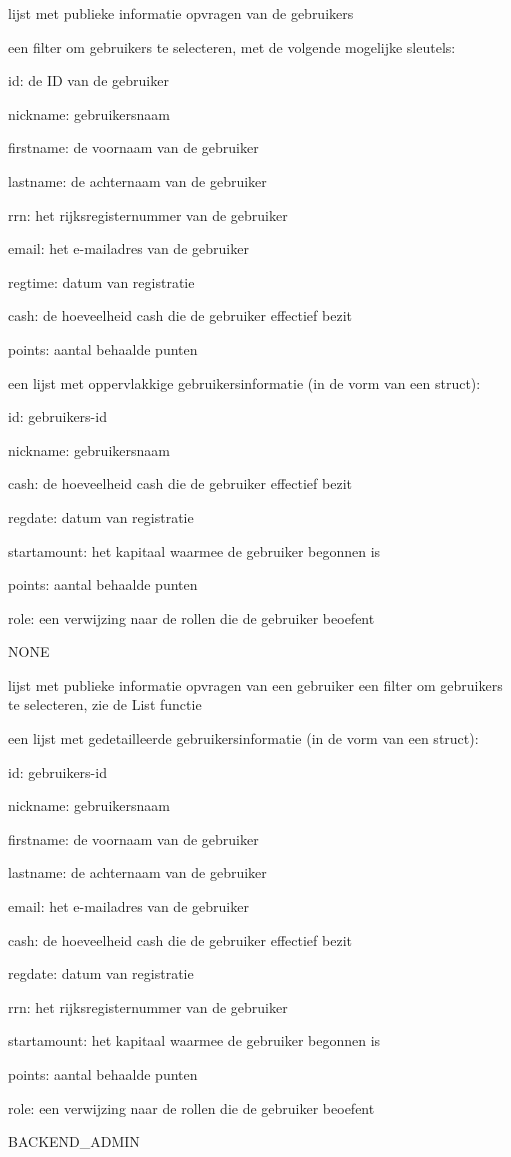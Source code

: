 	{ lijst met publieke informatie opvragen van de gebruikers }
	{ een filter om gebruikers te selecteren, met de volgende mogelijke sleutels:
		\begin{itemize_compact}
		\item{id: de ID van de gebruiker}
		\item{nickname: gebruikersnaam}
		\item{firstname: de voornaam van de gebruiker}
		\item{lastname: de achternaam van de gebruiker}
		\item{rrn: het rijksregisternummer van de gebruiker}
		\item{email: het e-mailadres van de gebruiker}
		\item{regtime: datum van registratie}
		\item{cash: de hoeveelheid cash die de gebruiker effectief bezit}
		\item{points: aantal behaalde punten}
		\end{itemize_compact} }
	{ een lijst met oppervlakkige gebruikersinformatie (in de vorm van een struct):
		\begin{itemize_compact}
		\item{id: gebruikers-id}
		\item{nickname: gebruikersnaam}
		\item{cash: de hoeveelheid cash die de gebruiker effectief bezit}
		\item{regdate: datum van registratie}
		\item{startamount: het kapitaal waarmee de gebruiker begonnen is}
		\item{points: aantal behaalde punten}
		\item{role: een verwijzing naar de rollen die de gebruiker beoefent}
		\end{itemize_compact} }
	{ NONE }

	{ lijst met publieke informatie opvragen van een gebruiker }
	{ een filter om gebruikers te selecteren, zie de List functie }
	{ een lijst met gedetailleerde gebruikersinformatie (in de vorm van een struct):
			\begin{itemize_compact}
			\item{id: gebruikers-id}
			\item{nickname: gebruikersnaam}
			\item{firstname: de voornaam van de gebruiker}
			\item{lastname: de achternaam van de gebruiker}
			\item{email: het e-mailadres van de gebruiker}
			\item{cash: de hoeveelheid cash die de gebruiker effectief bezit}
			\item{regdate: datum van registratie}
			\item{rrn: het rijksregisternummer van de gebruiker}
			\item{startamount: het kapitaal waarmee de gebruiker begonnen is}
			\item{points: aantal behaalde punten}
			\item{role: een verwijzing naar de rollen die de gebruiker beoefent}
			\end{itemize_compact} }
	{ BACKEND\_ADMIN }
	
